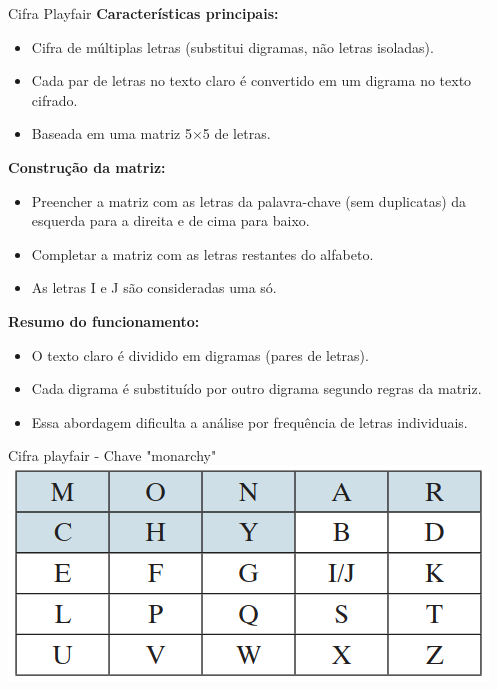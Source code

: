 \begin{frame}{Cifra Playfair}
\textbf{Características principais:}  
\begin{itemize}
    \item Cifra de múltiplas letras (substitui digramas, não letras isoladas).  
    \item Cada par de letras no texto claro é convertido em um digrama no texto cifrado.  
    \item Baseada em uma matriz 5×5 de letras.
\end{itemize}

\medskip
\textbf{Construção da matriz:}  
\begin{itemize}
    \item Preencher a matriz com as letras da palavra-chave (sem duplicatas) da esquerda para a direita e de cima para baixo.  
    \item Completar a matriz com as letras restantes do alfabeto.  
    \item As letras I e J são consideradas uma só.
\end{itemize}

\medskip
\textbf{Resumo do funcionamento:}  
\begin{itemize}
    \item O texto claro é dividido em digramas (pares de letras).  
    \item Cada digrama é substituído por outro digrama segundo regras da matriz.  
    \item Essa abordagem dificulta a análise por frequência de letras individuais.  
\end{itemize}
\end{frame}

\begin{frame}{Cifra playfair - Chave "monarchy"}
    \centering
    \includegraphics[width=0.8\linewidth]{Figuras/Cifra-playfair.png}


\end{frame}

